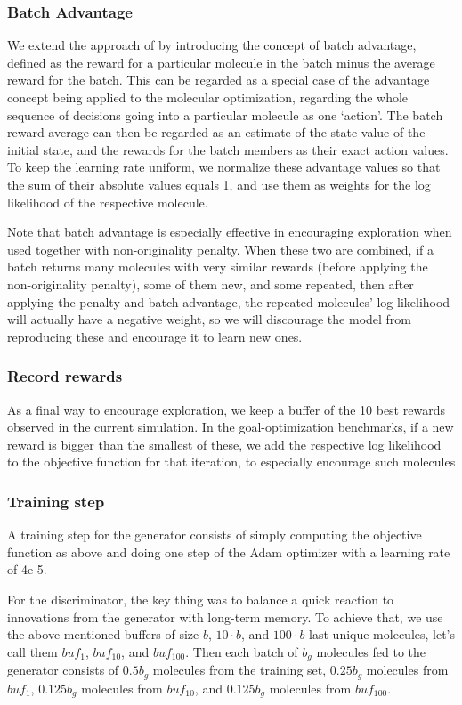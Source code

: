 \documentclass{article}
\begin{document}
\subsubsection{Batch Advantage}
We extend the approach of \cite{segler2017} by introducing the concept of batch advantage, defined as the reward for a particular molecule in the batch minus the average reward for the batch. This can be regarded as a special case of the advantage concept being applied to the molecular optimization, regarding the whole sequence of decisions going into a particular molecule as one `action'. The batch reward average can then be regarded as an estimate of the state value of the initial state, and the rewards for the batch members as their exact action values. To keep the learning rate uniform, we normalize these advantage values so that the sum of their absolute values equals 1, and use them as weights for the log likelihood of the respective molecule.

Note that batch advantage is especially effective in encouraging exploration when used together with non-originality penalty. When these two are combined, if a batch returns many molecules with very similar rewards (before applying the non-originality penalty), some of them new, and some repeated, then after applying the penalty and batch advantage, the repeated molecules' log likelihood will actually have a negative weight, so we will discourage the model from reproducing these and encourage it to learn new ones.
\subsubsection{Record rewards}
As a final way to encourage exploration, we keep a buffer of the 10 best rewards observed in the current simulation. In the goal-optimization benchmarks, if a new reward is bigger than the smallest of these, we add the respective log likelihood to the objective function for that iteration, to especially encourage such molecules
\subsubsection{Training step}
A training step for the generator consists of simply computing the objective function as above and doing one step of the Adam optimizer with a learning rate of 4e-5. 

For the discriminator, the key thing was to balance a quick reaction to innovations from the generator with long-term memory. To achieve that, we use the above mentioned buffers of size $b$, $10\cdot b$, and $100\cdot b$ last unique molecules, let's call them $buf_1$, $buf_{10}$, and $buf_{100}$. Then each batch of $b_g$ molecules fed to the generator consists of $0.5 b_g$ molecules from the training set, $0.25 b_g$ molecules from $buf_1$,  $0.125 b_g$ molecules from $buf_{10}$, and  $0.125 b_g$ molecules from $buf_{100}$. 
\end{document}
